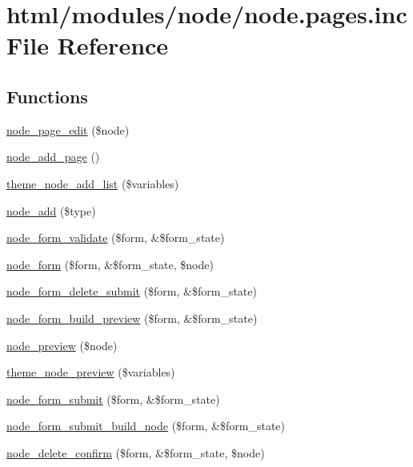 \hypertarget{node_8pages_8inc}{
\section{html/modules/node/node.pages.inc File Reference}
\label{node_8pages_8inc}
}
\subsection*{Functions}
\begin{DoxyCompactItemize}
\item 
\hyperlink{node_8pages_8inc_a553fc35bb17545341a3fcc36360fb43b}{node\_\-page\_\-edit} (\$node)
\item 
\hyperlink{node_8pages_8inc_ac51e34d673a1de68491ea88ea30832b9}{node\_\-add\_\-page} ()
\item 
\hyperlink{group__themeable_gab493e4a21e1f9653a52edf932492f6f6}{theme\_\-node\_\-add\_\-list} (\$variables)
\item 
\hyperlink{node_8pages_8inc_a29be8dfd0fadad9f4399d50ab3615461}{node\_\-add} (\$type)
\item 
\hyperlink{node_8pages_8inc_aedf9f810594bc4c402a92cb197930bd9}{node\_\-form\_\-validate} (\$form, \&\$form\_\-state)
\item 
\hyperlink{group__forms_ga267299500e205db099ee4e8396769d3f}{node\_\-form} (\$form, \&\$form\_\-state, \$node)
\item 
\hyperlink{node_8pages_8inc_a5cdd62f89098801ac87b85d8c61e7ee2}{node\_\-form\_\-delete\_\-submit} (\$form, \&\$form\_\-state)
\item 
\hyperlink{node_8pages_8inc_a71425b02d4c0dd3af239bffdd7e1649b}{node\_\-form\_\-build\_\-preview} (\$form, \&\$form\_\-state)
\item 
\hyperlink{node_8pages_8inc_a774d9df7be341a7c9058555e8cfb4b2b}{node\_\-preview} (\$node)
\item 
\hyperlink{group__themeable_ga1a03fc98e8ba251ec4b971a27b615f09}{theme\_\-node\_\-preview} (\$variables)
\item 
\hyperlink{node_8pages_8inc_addb125e26be73cec8769d2e729d7aa2c}{node\_\-form\_\-submit} (\$form, \&\$form\_\-state)
\item 
\hyperlink{node_8pages_8inc_a09cc7aec34e871fc093e18e18b8f4889}{node\_\-form\_\-submit\_\-build\_\-node} (\$form, \&\$form\_\-state)
\item 
\hyperlink{node_8pages_8inc_a6394c9476a3cbc56ba6130755f99497e}{node\_\-delete\_\-confirm} (\$form, \&\$form\_\-state, \$node)

\end{DoxyCompactItemize}
